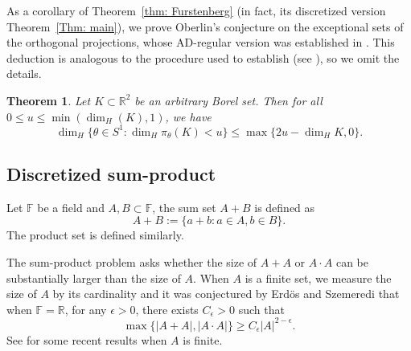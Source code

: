 \documentclass{amsart}
\newtheorem{theorem}[prop]{Theorem}
\newcommand{\R}{\mathbb{R}}
\begin{document}
As a corollary of Theorem~\ref{thm: Furstenberg} (in fact, its discretized version Theorem~\ref{Thm: main}), we prove Oberlin's conjecture \cite[(1.8)]{oberlin2012restricted} on the exceptional sets of the orthogonal projections, whose AD-regular version was established in \cite[Theorem 1.13]{orponen2023projections}. This deduction is analogous to the procedure used to establish \cite[Theorem 1.13]{orponen2023projections} (see \cite[Section 6.1]{orponen2023projections}), so we omit the details.







\begin{theorem}\label{thm:projections}
    Let $K \subset \R^2$ be an arbitrary Borel set. Then for all $0 \le u \le \min(\dim_H (K), 1)$, we have
    \begin{equation*}
        \dim_H \{ \theta \in S^1 : \dim_H \pi_\theta (K) < u \} \le \max\{ 2u - \dim_H K, 0 \}.
    \end{equation*}
\end{theorem}








\subsection{Discretized sum-product}



Let  $\mathbb{F}$ be a field and $A, B\subset \mathbb{F}$, the sum set $A+B$ is defined as 
\[
A+B:=\{ a+b: a\in A, b\in B\}.
\]
The product set is defined similarly. 

The sum-product problem asks whether the size of  $A+A$ or $A\cdot A$  can be substantially larger than the size of $A$.  When $A$ is a finite set, we measure the size of $A$ by its cardinality and it was conjectured by Erd\"{o}s and Szemeredi that when $\mathbb{F}=\mathbb{R}$, for any $\epsilon>0$, there exists $C_{\epsilon}>0$ such that 
\[
\max\{ |A+A|, |A\cdot A|\}\geq C_{\epsilon} |A|^{2-\epsilon}. 
\]
 See \cite{solymosi2009bounding, mohammadi2023attaining,roche2023better,roche2016new,rudnev2020stronger,rudnev2022update} for some recent results when $A$ is finite. 
\end{document}
